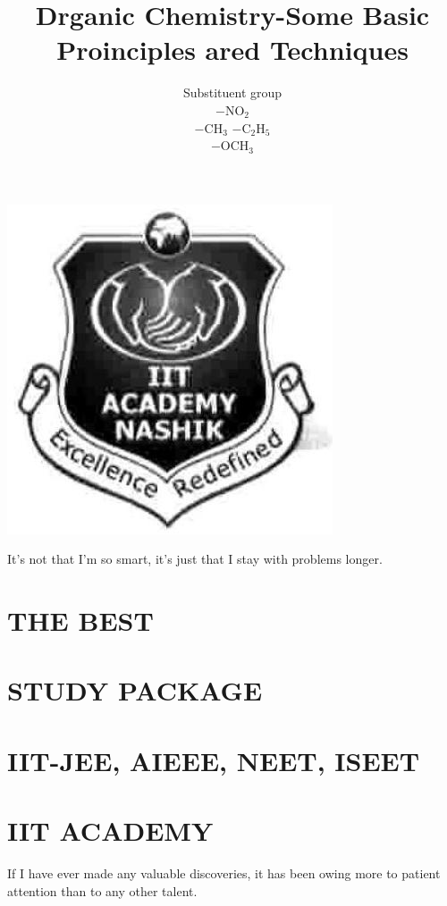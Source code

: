 \documentclass[10pt]{article}
\title{Drganic Chemistry-Some Basic Proinciples ared Techniques }
\author{Substituent group\\
$-\mathrm{NO}_{2}$\\
$-\mathrm{CH}_{3}$ $-\mathrm{C}_{2} \mathrm{H}_{5}$\\
$-\mathrm{OCH}_{3}$}
\date{}
\begin{document}
\maketitle
\begin{center}
\includegraphics[max width=\textwidth]{2025_01_28_8470952b98110cec3aabg-001}
\end{center}

It's not that I'm so smart, it's just that I stay with problems longer.

\section*{THE BEST}
\section*{STUDY PACKAGE}
\section*{IIT-JEE, AIEEE, NEET, ISEET}
\section*{IIT ACADEMY}
If I have ever made any valuable discoveries, it has been owing more to patient attention than to any other talent.
\end{document}
